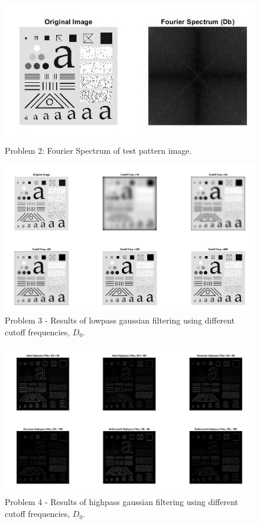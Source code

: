 \documentclass[./rarnold_report4.tex]{subfiles}
\begin{document}
  	\begin{figure}[!htbp]
	\centering
	\includegraphics[scale=1.3]{"problem2"}
	\captionsetup{justification=centering}
	\caption{Problem 2: Fourier Spectrum of test pattern image.} 
	\label{p2}
	\end{figure}
	
	\clearpage
	
	\begin{figure}[!htbp]
	\centering
	\includegraphics[scale=0.43]{"problem3"}
	\caption{Problem 3 - Results of lowpass gaussian filtering using different cutoff frequencies, $D_{0}$.} 
	\label{p3}
	\end{figure}
	
	\clearpage
	
	\begin{figure}[!htbp]
	\centering
	\includegraphics[scale=0.42]{"problem4"}
	\caption{Problem 4 - Results of highpass gaussian filtering using different cutoff frequencies, $D_{0}$.} 
	\label{p4}
	\end{figure}
	
\end{document}
